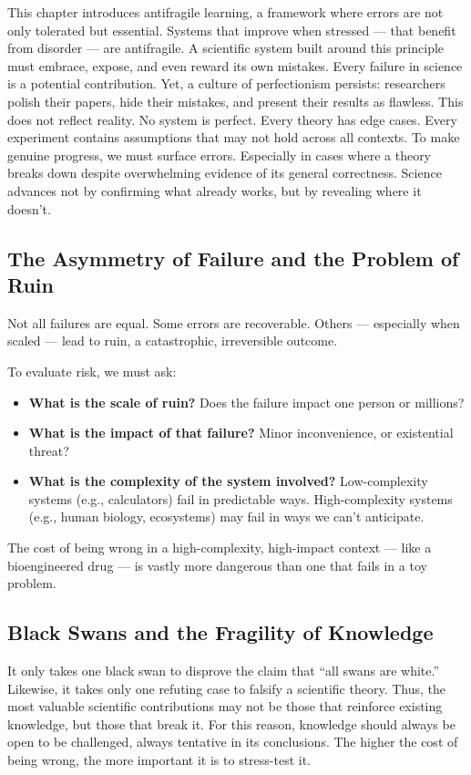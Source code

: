 \documentclass{article}
\begin{document}
This chapter introduces antifragile learning, a framework where errors are not only tolerated but essential. Systems that improve when stressed — that benefit from disorder — are antifragile. A scientific system built around this principle must embrace, expose, and even reward its own mistakes. Every failure in science is a potential contribution. Yet, a culture of perfectionism persists: researchers polish their papers, hide their mistakes, and present their results as flawless. This does not reflect reality. No system is perfect. Every theory has edge cases. Every experiment contains assumptions that may not hold across all contexts. To make genuine progress, we must surface errors. Especially in cases where a theory breaks down despite overwhelming evidence of its general correctness. Science advances not by confirming what already works, but by revealing where it doesn't.

\subsection{The Asymmetry of Failure and the Problem of Ruin}

Not all failures are equal. Some errors are recoverable. Others — especially when scaled — lead to ruin, a catastrophic, irreversible outcome.

To evaluate risk, we must ask:

\begin{itemize}
	\item \textbf{What is the scale of ruin?} Does the failure impact one person or millions?
	\item \textbf{What is the impact of that failure?} Minor inconvenience, or existential threat?
	\item \textbf{What is the complexity of the system involved?} Low-complexity systems (e.g., calculators) fail in predictable ways. High-complexity systems (e.g., human biology, ecosystems) may fail in ways we can’t anticipate.
\end{itemize}

The cost of being wrong in a high-complexity, high-impact context — like a bioengineered drug — is vastly more dangerous than one that fails in a toy problem. 

\subsection{Black Swans and the Fragility of Knowledge}

It only takes one black swan to disprove the claim that “all swans are white.” Likewise, it takes only one refuting case to falsify a scientific theory. Thus, the most valuable scientific contributions may not be those that reinforce existing knowledge, but those that break it. For this reason, knowledge should always be open to be challenged, always tentative in its conclusions. The higher the cost of being wrong, the more important it is to stress-test it.
\end{document}
